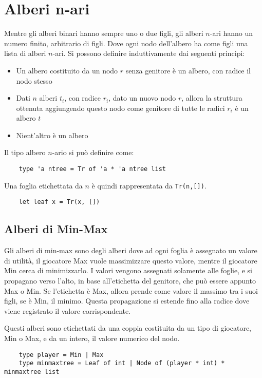\documentclass{article}
\numberwithin{equation}{subsection}
\begin{document}
\clearpage

\section{Alberi n-ari}

Mentre gli alberi binari hanno sempre uno o due figli, gli alberi $n$-ari hanno un numero finito, arbitrario di figli. Dove ogni nodo dell'albero ha come figli una lista di alberi $n$-ari. Si possono definire induttivamente dai seguenti principi:
\begin{itemize}
    \item Un albero costituito da un nodo $r$ senza genitore è un albero, con radice il nodo stesso
    \item Dati $n$ alberi $t_i$, con radice $r_i$, dato un nuovo nodo $r$, allora la struttura ottenuta aggiungendo questo nodo come genitore di tutte le radici $r_i$ è un albero $t$
    \item Nient'altro è un albero
\end{itemize}
Il tipo albero $n$-ario si può definire come: 
\begin{verbatim}
    type 'a ntree = Tr of 'a * 'a ntree list
\end{verbatim}
Una foglia etichettata da $n$ è quindi rappresentata da \verb|Tr(n,[])|. 
\begin{verbatim}
    let leaf x = Tr(x, [])    
\end{verbatim}

\subsection{Alberi di Min-Max}

Gli alberi di min-max sono degli alberi dove ad ogni foglia è assegnato un valore di utilità, il giocatore Max vuole massimizzare questo valore, mentre il giocatore Min cerca di minimizzarlo. I valori vengono assegnati solamente alle foglie, e si propagano verso l'alto, in base all'etichetta del genitore, che può essere appunto Max o Min. Se l'etichetta è Max, allora prende come valore il massimo tra i suoi figli, se è Min, il minimo. Questa propagazione si estende fino alla radice dove viene registrato il valore corrispondente. 

Questi alberi sono etichettati da una coppia costituita da un tipo di giocatore, Min o Max, e da un intero, il valore numerico del nodo. 
\begin{verbatim}
    type player = Min | Max
    type minmaxtree = Leaf of int | Node of (player * int) * minmaxtree list
\end{verbatim}
\end{document}
